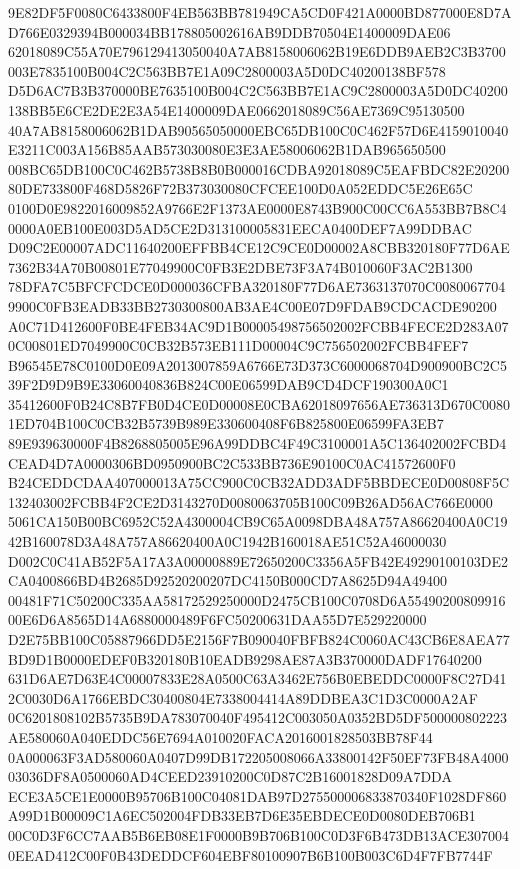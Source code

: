 \documentclass[UTF8,fontset=fandol,zihao=-4,a4paper]{ctexart}
\begin{document}
{{9E82DF5F0080C6433800F4EB563BB781949CA5CD0F421A0000BD877000E8D7AD766E0329394B000034BB178805002616AB9DDB70504E1400009DAE06
62018089C55A70E796129413050040A7AB8158006062B19E6DDB9AEB2C3B3700003E7835100B004C2C563BB7E1A09C2800003A5D0DC40200138BF578
D5D6AC7B3B370000BE7635100B004C2C563BB7E1AC9C2800003A5D0DC40200138BB5E6CE2DE2E3A54E1400009DAE0662018089C56AE7369C95130500
40A7AB8158006062B1DAB90565050000EBC65DB100C0C462F57D6E4159010040E3211C003A156B85AAB573030080E3E3AE58006062B1DAB965650500
008BC65DB100C0C462B5738B8B0B000016CDBA92018089C5EAFBDC82E2020080DE733800F468D5826F72B373030080CFCEE100D0A052EDDC5E26E65C
0100D0E9822016009852A9766E2F1373AE0000E8743B900C00CC6A553BB7B8C40000A0EB100E003D5AD5CE2D313100005831EECA0400DEF7A99DDBAC
D09C2E00007ADC11640200EFFBB4CE12C9CE0D00002A8CBB320180F77D6AE7362B34A70B00801E77049900C0FB3E2DBE73F3A74B010060F3AC2B1300
78DFA7C5BFCFCDCE0D000036CFBA320180F77D6AE7363137070C00800677049900C0FB3EADB33BB2730300800AB3AE4C00E07D9FDAB9CDCACDE90200
A0C71D412600F0BE4FEB34AC9D1B00005498756502002FCBB4FECE2D283A070C00801ED7049900C0CB32B573EB111D00004C9C756502002FCBB4FEF7
B96545E78C0100D0E09A2013007859A6766E73D373C6000068704D900900BC2C539F2D9D9B9E33060040836B824C00E06599DAB9CD4DCF190300A0C1
35412600F0B24C8B7FB0D4CE0D00008E0CBA62018097656AE736313D670C00801ED704B100C0CB32B5739B989E330600408F6B825800E06599FA3EB7
89E939630000F4B8268805005E96A99DDBC4F49C3100001A5C136402002FCBD4CEAD4D7A0000306BD0950900BC2C533BB736E90100C0AC41572600F0
B24CEDDCDAA407000013A75CC900C0CB32ADD3ADF5BBDECE0D00808F5C132403002FCBB4F2CE2D3143270D0080063705B100C09B26AD56AC766E0000
5061CA150B00BC6952C52A4300004CB9C65A0098DBA48A757A86620400A0C1942B160078D3A48A757A86620400A0C1942B160018AE51C52A46000030
D002C0C41AB52F5A17A3A00000889E72650200C3356A5FB42E49290100103DE2CA0400866BD4B2685D92520200207DC4150B000CD7A8625D94A49400
00481F71C50200C335AA58172529250000D2475CB100C0708D6A5549020080991600E6D6A8565D14A6880000489F6FC50200631DAA55D7E529220000
D2E75BB100C05887966DD5E2156F7B090040FBFB824C0060AC43CB6E8AEA77BD9D1B0000EDEF0B320180B10EADB9298AE87A3B370000DADF17640200
631D6AE7D63E4C00007833E28A0500C63A3462E756B0EBEDDC0000F8C27D412C0030D6A1766EBDC30400804E7338004414A89DDBEA3C1D3C0000A2AF
0C6201808102B5735B9DA783070040F495412C003050A0352BD5DF500000802223AE580060A040EDDC56E7694A010020FACA2016001828503BB78F44
0A000063F3AD580060A0407D99DB172205008066A33800142F50EF73FB48A400003036DF8A0500060AD4CEED23910200C0D87C2B16001828D09A7DDA
ECE3A5CE1E0000B95706B100C04081DAB97D275500006833870340F1028DF860A99D1B00009C1A6EC502004FDB33EB7D6E35EBDECE0D0080DEB706B1
00C0D3F6CC7AAB5B6EB08E1F0000B9B706B100C0D3F6B473DB13ACE3070040EEAD412C00F0B43DEDDCF604EBF80100907B6B100B003C6D4F7FB7744F
}}
\end{document}
